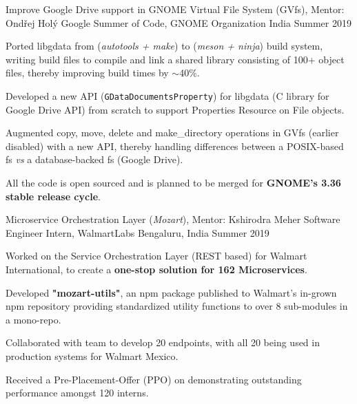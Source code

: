 \begin{cventries}

  \cventry
  {Improve Google Drive support in GNOME Virtual File System (GVfs), Mentor: Ondřej Holý}
  {Google Summer of Code, GNOME Organization}
  {India}
  {Summer 2019}
  {
    \begin{cvitems}
    \item Ported libgdata from (\textit{autotools + make}) to (\textit{meson + ninja}) build system, writing build files to compile and link a shared library consisting of  100+ object files, thereby improving build times by $\sim$40\%.
    \item Developed a new API (\texttt{GDataDocumentsProperty}) for libgdata (C library for Google Drive API) from scratch to support Properties Resource on File objects.
    \item Augmented copy, move, delete and make\_directory operations in GVfs (earlier disabled) with a new API, thereby handling differences between a POSIX-based fs \textit{vs} a database-backed fs (Google Drive).
    \item All the code is open sourced and is planned to be merged for \textbf{GNOME's 3.36 stable release cycle}.
    \end{cvitems}
  }

  \cventry
  {Microservice Orchestration Layer (\textit{Mozart}), Mentor: Kshirodra Meher}
  {Software Engineer Intern, WalmartLabs}
  {Bengaluru, India}
  {Summer 2019}
  {
    \begin{cvitems}
    \item Worked on the Service Orchestration Layer (REST based) for Walmart International, to create a \textbf{one-stop solution for 162 Microservices}.
    \item Developed \textbf{"mozart-utils"}, an npm package published to Walmart's in-grown npm repository providing standardized utility functions to over 8 sub-modules in a mono-repo.
    \item Collaborated with team to develop 20 endpoints, with all 20 being used in production systems for Walmart Mexico.
    \item Received a Pre-Placement-Offer (PPO) on demonstrating outstanding performance amongst 120 interns.
    \end{cvitems}
  }


\end{cventries}
